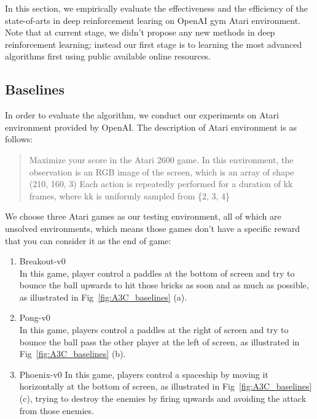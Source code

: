 

In this section, we empirically evaluate the effectiveness and the efficiency of the
state-of-arts in deep reinforcement learing on OpenAI gym Atari environment. Note 
that at current stage, we didn't propose any new methods in deep reinforcement learning;
instead our first stage is to learning the most advanced algorithms first using public
available online resources. 


\subsection{Baselines}

In order to evaluate the algorithm, we conduct our experiments on Atari environment
provided by OpenAI. The description of Atari environment is as follows:
\begin{quote}
Maximize your score in the Atari 2600 game. In this
environment, the observation is an RGB image of the screen, which is an array
of shape (210, 160, 3) Each action is repeatedly performed for a duration of
kk frames, where kk is uniformly sampled from \{2, 3, 4\}~\cite{brockman2016openai}
\end{quote}

We choose three Atari games as our testing environment, all of which are unsolved environments, 
which means those games don't have a specific reward that you can consider it as the end of game:

\begin{enumerate}
\item Breakout-v0\\
In this game, player control a paddles at the bottom of screen and try to bounce the ball upwards
to hit those bricks as soon and as much as possible, as illustrated in Fig~\ref{fig:A3C_baselines} (a). 

\item Pong-v0\\
In this game, players control a paddles at the right of screen and try to bounce the ball pass the
other player at the left of screen, as illustrated in Fig~\ref{fig:A3C_baselines} (b). 

\item Phoenix-v0
In this game, players control a spaceship by moving it horizontally at the bottom of screen, as 
illustrated in Fig~\ref{fig:A3C_baselines} (c), trying to destroy the enemies by firing upwards 
and avoiding the attack from those enemies. 
\end{enumerate}


